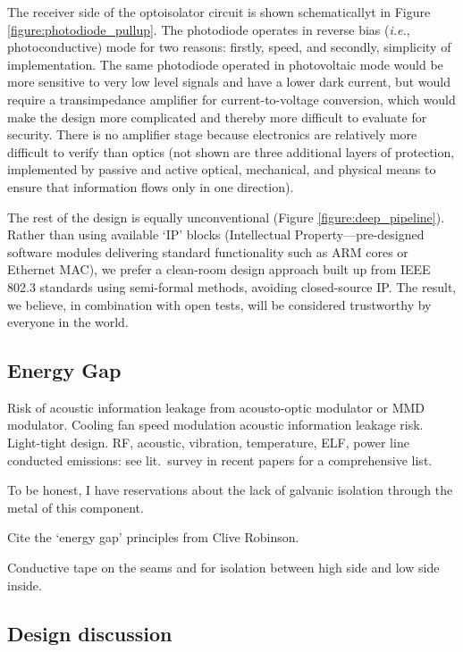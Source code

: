 \documentclass[conference]{IEEEtran}
\begin{document}
The receiver side of the optoisolator circuit is shown schematicallyt in
Figure \ref{figure:photodiode_pullup}. The photodiode operates in reverse
bias ({\it i.e.}, photoconductive) mode for two reasons: firstly, speed, and
secondly, simplicity of implementation. The same photodiode operated in
photovoltaic mode would be more sensitive to very low level signals and have
a lower dark current, but would require a transimpedance amplifier for
current-to-voltage conversion, which would make the design more complicated
and thereby more difficult to evaluate for security. There is no amplifier
stage because electronics are relatively more difficult to verify than optics
(not shown are three additional layers of protection, implemented by passive
and active optical, mechanical, and physical means to ensure that information
flows only in one direction).

The rest of the design is equally unconventional (Figure
\ref{figure:deep_pipeline}). Rather than using available `IP' blocks
(Intellectual Property---pre-designed software modules delivering standard
functionality such as ARM cores or Ethernet MAC), we prefer a clean-room
design approach built up from IEEE 802.3 standards using semi-formal methods,
avoiding closed-source IP. The result, we believe, in combination with open
tests, will be considered trustworthy by everyone in the world.

\subsection{Energy Gap}

Risk of acoustic information leakage from acousto-optic modulator or MMD
modulator. Cooling fan speed modulation acoustic information leakage risk.
Light-tight design. RF, acoustic, vibration, temperature, ELF, power line
conducted emissions: see lit.\ survey in recent papers for a comprehensive
list.

To be honest, I have reservations about the lack of galvanic isolation
through the metal of this component.

Cite the `energy gap' principles from Clive Robinson.

Conductive tape on the seams and for isolation between high side and low side
inside.

\subsection{Design discussion}
\end{document}
